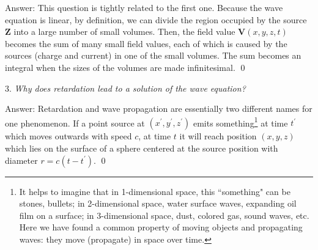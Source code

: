\documentclass[11pt]{article}              %
\begin{document}

Answer: This question is tightly related to the first one. Because the wave equation is linear, by definition, we can divide the region occupied by the source ${\mathbf Z}$ into a large number of small volumes. Then, the field value ${\mathbf V}(x,y,z,t)$ becomes the sum of many small field values, each of which is caused by the sources (charge and current) in one of the small volumes. The sum becomes an integral when the sizes of the volumes are made infinitesimal. 
\qed

3. {\it Why does retardation lead to a solution of the wave equation? } 

Answer: %
Retardation and wave propagation are essentially two different names for one phenomenon. If a point source at $(x^\prime,y^\prime,z^\prime)$ emits something\footnote{It helps to imagine that in 1-dimensional space, this ``something" can be stones, bullets; in 2-dimensional space, water surface waves, expanding oil film on a surface; in 3-dimensional space, dust, colored gas, sound waves, etc. Here we have found a common property of moving objects and propagating waves: they move (propagate) in space over time.} at time $t^\prime$ which moves outwards with speed $c$, at time $t$ it will reach position $(x,y,z)$ which lies on the surface of a sphere centered at the source position with diameter $r=c(t-t^\prime)$. %
\qed
\end{document}

